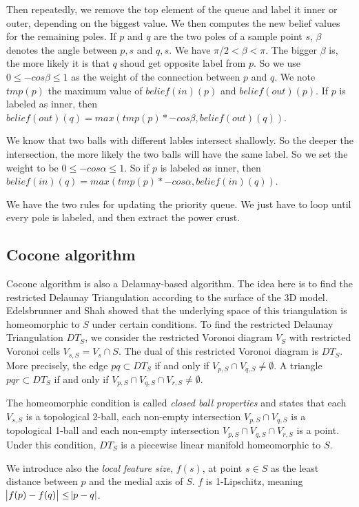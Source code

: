 \documentclass[a4paper]{article}
\begin{document}
Then repeatedly, we remove the top element of the queue and label it inner or outer, depending on the biggest value. We then computes the new belief values for the remaining poles. If $p$ and $q$ are the two poles of a sample point $s$, $\beta$ denotes the angle between $p,s$ and $q,s$. We have $\pi/2 < \beta < \pi$. The bigger $\beta$ is, the more likely it is that $q$ shoud get opposite label from $p$. So we use $0 \le -cos\beta \le 1$ as the weight of the connection between $p$ and $q$. We note $tmp(p)$ the maximum value of $belief(in)(p)$ and $belief(out)(p)$. If $p$ is labeled as inner, then $belief(out)(q) = max(tmp(p)*-cos\beta, belief(out)(q))$.

We know that two balls with different lables intersect shallowly. So the deeper the intersection, the more likely the two balls will have the same label. So we set the weight to be $0 \le -cos\alpha \le 1$. So if $p$ is labeled as inner, then $belief(in)(q) = max(tmp(p)*-cos\alpha, belief(in)(q))$.

We have the two rules for updating the priority queue. We just have to loop until every pole is labeled, and then extract the power crust.

\subsection{Cocone algorithm}
Cocone algorithm is also a Delaunay-based algorithm. The idea here is to find the restricted Delaunay Triangulation according to the surface of the 3D model. Edelsbrunner and Shah showed that the underlying space of this triangulation is homeomorphic to $S$ under certain conditions. To find the restricted Delaunay Triangulation $DT_S$, we consider the restricted Voronoi diagram $V_S$ with restricted Voronoi cells $V_{s,S} = V_s\cap S$. The dual of this restricted Voronoi diagram is $DT_S$. More precisely, the edge $pq \subset DT_S$ if and only if $V_{p,S}\cap V_{q,S} \ne \emptyset$. A triangle $pqr \subset DT_S$ if and only if $V_{p,S}\cap V_{q,S}\cap V_{r,S} \ne \emptyset$.

The homeomorphic condition is called \emph{closed ball properties} and states that each $V_{s,S}$ is a topological 2-ball, each non-empty intersection $V_{p,S}\cap V_{q,S}$ is a topological 1-ball and each non-empty intersection $V_{p,S}\cap V_{q,S}\cap V_{r,S}$ is a point. Under this condition, $DT_S$ is a piecewise linear manifold homeomorphic to $S$.

We introduce also the \emph{local feature size}, $f(s)$, at point $s \in S$ as the least distance between $p$ and the medial axis of $S$. $f$ is 1-Lipschitz, meaning $\abs{f(p) - f(q)}\le\abs{p - q}$.
\end{document}
